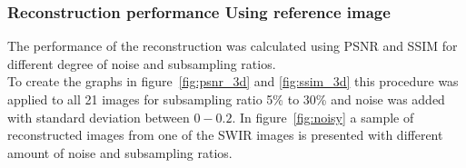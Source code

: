 \subsubsection{Reconstruction performance Using reference image}
\label{sec:reconstruction_performance}
The performance of the reconstruction was calculated using PSNR and SSIM for different degree of noise and subsampling ratios.\\[0.1in]

To create the graphs in figure~\ref{fig:psnr_3d} and \ref{fig:ssim_3d} this procedure was applied to all 21 images for subsampling ratio 5\% to 30\% and noise was added with standard deviation between $0 - 0.2$. In figure~\ref{fig:noisy} a sample of reconstructed images from one of the SWIR images is presented with different amount of noise and subsampling ratios.


